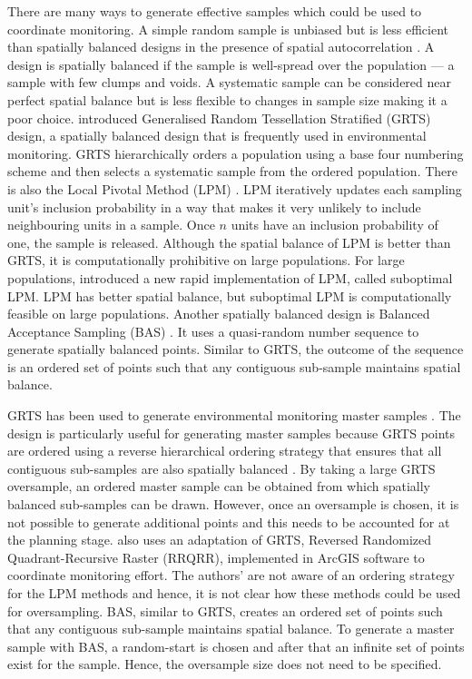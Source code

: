 \documentclass[titlepage]{article}
\begin{document}
There are many ways to generate effective samples which could be used to coordinate monitoring. A simple random sample is unbiased but is less efficient than spatially balanced designs in the presence of spatial autocorrelation \citep{cochran1946relative, Grafstrom2013}. A design is spatially balanced if the sample is well-spread over the population --- a sample with few clumps and voids. A systematic sample can be considered near perfect spatial balance but is less flexible to changes in sample size making it a poor choice. \citet{StevensOlsen2004} introduced Generalised Random Tessellation Stratified (GRTS) design, a spatially balanced design that is frequently used in environmental monitoring. GRTS hierarchically orders a population using a base four numbering scheme and then selects a systematic sample from the ordered population. There is also the Local Pivotal Method (LPM) \citep{Grafstrom2012}. LPM iteratively updates each sampling unit's inclusion probability in a way that makes it very unlikely to include neighbouring units in a sample. Once $n$ units have an inclusion probability of one, the sample is released. Although the spatial balance of LPM is better than GRTS, it is computationally prohibitive on large populations. For large populations, \citet{Grafstrom2014} introduced a new rapid implementation of LPM, called suboptimal LPM. LPM has better spatial balance, but suboptimal LPM is computationally feasible on large populations. Another spatially balanced design is Balanced Acceptance Sampling (BAS) \citep{Robertson2013}. It uses a quasi-random number sequence to generate spatially balanced points. Similar to GRTS, the outcome of the sequence is an ordered set of points such that any contiguous sub-sample maintains spatial balance.

GRTS has been used to generate environmental monitoring master samples \citep{LarsenOlsenStevens2008}. The design is particularly useful for generating master samples because GRTS points are ordered using a reverse hierarchical ordering strategy that ensures that all contiguous sub-samples are also spatially balanced \citep{StevensOlsen2004}. By taking a large GRTS oversample, an ordered master sample can be obtained from which spatially balanced sub-samples can be drawn. However, once an oversample is chosen, it is not possible to generate additional points and this needs to be accounted for at the planning stage. \citet{theobald2016} also uses an adaptation of GRTS, Reversed Randomized Quadrant-Recursive
Raster (RRQRR), implemented in ArcGIS software \citep{theobald2007} to coordinate monitoring effort. The authors' are not aware of an ordering strategy for the LPM methods and hence, it is not clear how these methods could be used for oversampling. BAS, similar to GRTS, creates an ordered set of points such that any contiguous sub-sample maintains spatial balance. To generate a master sample with BAS, a random-start is chosen and after that an infinite set of points exist for the sample. Hence, the oversample size does not need to be specified.
\end{document}
